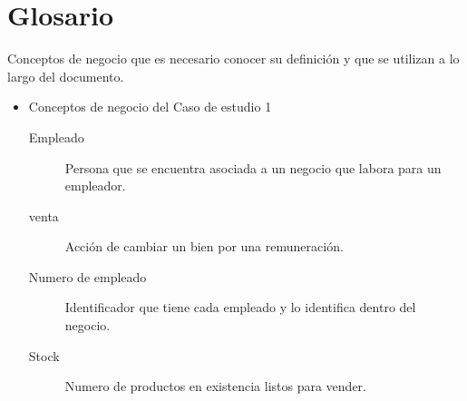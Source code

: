 \chapter{Glosario}

	Conceptos de negocio que es necesario conocer su definición y que se utilizan a lo largo del documento.\\
	
	\begin{itemize}
		\item Conceptos de negocio del Caso de estudio 1
		\begin{description}
			\item[Empleado] Persona que se encuentra asociada a un negocio que labora para un empleador.
			\item[venta] Acción de cambiar un bien por una remuneración.
			\item[Numero de empleado] Identificador que tiene cada empleado y lo identifica dentro del negocio.
			\item[Stock] Numero de productos en existencia listos para vender.
		\end{description}
	\end{itemize}
	
	
	